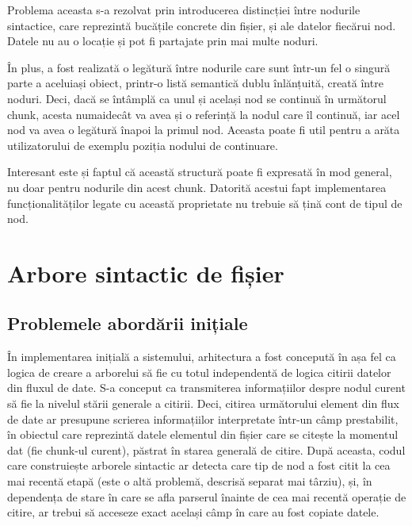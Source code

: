 \documentclass[a4paper,12pt]{report}
\begin{document}
Problema aceasta s-a rezolvat prin introducerea distincției între nodurile sintactice,
care reprezintă bucățile concrete din fișier, și ale datelor fiecărui nod.
Datele nu au o locație și pot fi partajate prin mai multe noduri.

În plus, a fost realizată o legătură între nodurile care sunt într-un fel o singură parte a aceluiași obiect,
printr-o listă semantică dublu înlănțuită, creată între noduri.
Deci, dacă se întâmplă ca unul și același nod se continuă în următorul chunk,
acesta numaidecât va avea și o referință la nodul care îl continuă,
iar acel nod va avea o legătură înapoi la primul nod.
Aceasta poate fi util pentru a arăta utilizatorului de exemplu poziția nodului de continuare.

Interesant este și faptul că această structură poate fi expresată în mod general,
nu doar pentru nodurile din acest chunk.
Datorită acestui fapt implementarea funcționalităților legate cu această proprietate
nu trebuie să țină cont de tipul de nod.

\section{Arbore sintactic de fișier}

\subsection{Problemele abordării inițiale}

În implementarea inițială a sistemului, arhitectura a fost concepută în așa fel ca
logica de creare a arborelui să fie cu totul independentă de logica citirii datelor din fluxul de date.
S-a conceput ca transmiterea informațiilor despre nodul curent să fie la nivelul stării generale a citirii.
Deci, citirea următorului element din flux de date ar presupune scrierea informațiilor interpretate
într-un câmp prestabilit, în obiectul care reprezintă datele elementul
din fișier care se citește la momentul dat (fie chunk-ul curent), păstrat în starea generală de citire.
După aceasta, codul care construiește arborele sintactic ar detecta care tip de nod a fost citit la cea mai recentă etapă 
(este o altă problemă, descrisă separat mai târziu),
și, în dependența de stare în care se afla parserul înainte de cea mai recentă operație de citire,
ar trebui să acceseze exact același câmp în care au fost copiate datele.
\end{document}
